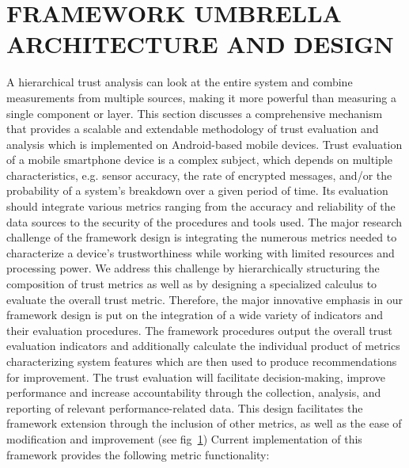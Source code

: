 \section{FRAMEWORK UMBRELLA ARCHITECTURE AND DESIGN}

A hierarchical trust analysis can look at the entire system and combine measurements from multiple sources, making
it more powerful than measuring a single component or layer.
This section discusses a comprehensive mechanism that provides a scalable and extendable methodology of trust
 evaluation and analysis which is implemented on Android-based mobile devices. 
Trust evaluation of a mobile smartphone device is a complex subject, which depends on multiple characteristics, 
e.g. sensor accuracy, the rate of encrypted messages, and/or the probability of a system's breakdown over a given period of time. Its evaluation should integrate various metrics ranging from the accuracy and reliability of the data sources to the security of the procedures and tools used. The major research challenge of the framework design is integrating the numerous metrics needed to characterize a device's trustworthiness while working with limited resources and processing power. 
We address this challenge by hierarchically structuring the composition of trust metrics as well as by designing a specialized calculus to evaluate the overall trust metric. 
Therefore, the major innovative emphasis in our framework design is put on the integration of a wide variety of indicators and their evaluation procedures. The framework procedures output the overall trust evaluation indicators and additionally calculate the individual product of metrics characterizing system features which are then used to produce recommendations for improvement. The trust evaluation will facilitate decision-making, improve performance and increase accountability through the collection, analysis, and reporting of relevant performance-related data. This design facilitates the framework extension through
 the inclusion of other metrics, as well as the ease of modification and improvement (see fig~\ref{})
Current implementation of this framework provides the following metric functionality: 

